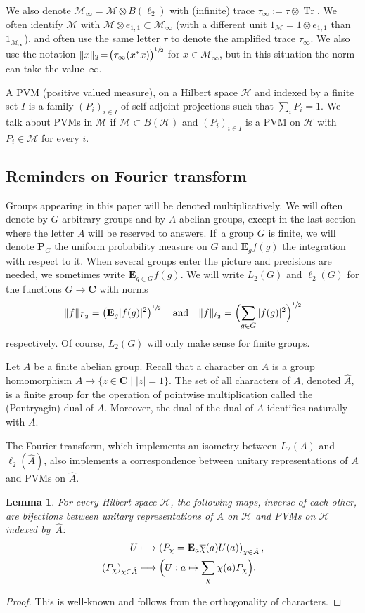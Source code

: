 \documentclass[JEP,XML,SOM,Unicode,published]{cedram}
\newcommand\mto{\mathchoice{\longmapsto}{\mapsto}{\mapsto}{\mapsto}}
\theoremstyle{plain}
\newtheorem{lemma}[theorem]{Lemma}
\theoremstyle{definition}
\newcommand{\C}{\mathbf{C}}
\newcommand{\cM}{\mathcal{M}}
\newcommand{\E}{\mathbf{E}}
\newcommand{\cH}{\mathcal{H}}
\newcommand{\prob}{\mathbf{P}}
\DeclareMathOperator{\Tr}{Tr}
\begin{document}
We also denote $\cM_\infty = \cM \overline{\otimes} B(\ell_2)$ with (infinite) trace $\tau_\infty:=\tau \otimes \Tr$. We often identify $\cM$ with $\cM \otimes e_{1,1} \subset \cM_\infty$ (with a different unit $1_\cM = 1 \otimes e_{1,1}$ than $1_{\cM_\infty}$), and often use the same letter $\tau$ to denote the amplified trace $\tau_\infty$. We also use the notation $\|x\|_2 \!=\! \big(\tau_\infty(x^*x)\big)^{\sfrac 1 2}$ for $x \!\in\! \cM_\infty$, but in this situation the norm can take the value~$\infty$.

A PVM (positive valued measure), on a Hilbert space $\cH$ and indexed by a finite set $I$ is a family $(P_i)_{i\in I}$ of self-adjoint projections such that $\sum_i P_i=1$. We talk about PVMs in $\cM$ if $\cM\subset B(\cH)$ and $(P_i)_{i \in I}$ is a PVM on $\cH$ with $P_i \in \cM$ for every $i$.

\subsection{Reminders on Fourier transform}
Groups appearing in this paper will be denoted multiplicatively. We will often denote by $G$ arbitrary groups and by $A$ abelian groups, except in the last section where the letter $A$ will be reserved to answers. If~a group $G$ is finite, we will denote $\prob_G$ the uniform probability measure on $G$ and $\E_g f(g)$ the integration with respect to it. When several groups enter the picture and precisions are needed, we sometimes write $\E_{g \in G} f(g)$. We will write $L_2(G)$ and $\ell_2(G)$ for the functions $G \to \C$ with norms
\[
\|f\|_{L_2} = \left(\E_g |f(g)|^2\right)^{\sfrac 1 2}\quad\text{and}\quad\|f\|_{\ell_2} = \Bigl(\sum_{g \in G} |f(g)|^2\Bigr)^{\sfrac 1 2}
\]
respectively. Of course, $L_2(G)$ will only make sense for finite groups.

Let $A$ be a finite abelian group. Recall that a character on $A$ is a group homomorphism $A \to \{z \in \C \mid |z|=1\}$. The set of all characters of $A$, denoted $\hat A$, is a finite group for the operation of pointwise multiplication called the (Pontryagin) dual of $A$. Moreover, the dual of the dual of $A$ identifies naturally with $A$.

The Fourier transform, which implements an isometry between $L_2(A)$ and $\ell_2(\hat A)$, also implements a correspondence between unitary representations of $A$ and PVMs on $\hat A$.
\begin{lemma}\label{lem:Fourier_abelian_group} For every Hilbert space $\cH$, the following maps, inverse of each other, are bijections between unitary representations of $A$ on $\cH$ and PVMs on $\cH$ indexed by~$\hat A$:
\begin{align*}
U &\mto \left(P_\chi = \E_a \overline{\chi}(a) U(a)\right)_{\chi \in \hat A},
\\
(P_\chi)_{\chi \in \hat A} &\mto \Bigl( U: a \mapsto \sum_\chi \chi(a) P_\chi\Bigr).
\end{align*}
\end{lemma}
\begin{proof} This is well-known and follows from the orthogonality of characters.
\end{proof}
\end{document}
